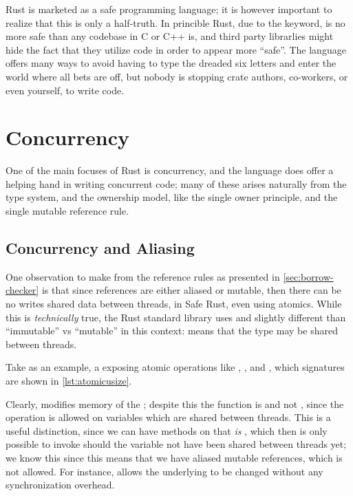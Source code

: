 Rust is marketed as a safe programming language; it is however important to realize that this is
only a half-truth. In princible Rust, due to the  keyword, is no more safe than any
codebase in C or C++ is, and third party librarlies might hide the fact that they utilize
 code in order to appear more ``safe''. The language offers many ways to avoid having
to type the dreaded six letters and enter the world where all bets are off, but nobody is stopping
crate authors, co-workers, or even yourself, to write  code.



\section{Concurrency}

One of the main focuses of Rust is concurrency, and the language does offer a helping hand in
writing concurrent code; many of these arises naturally from the type system, and the ownership
model, like the single owner principle, and the single mutable reference rule.


\subsection{Concurrency and Aliasing\label{sec:concurrency-and-aliasing}}

One observation to make from the reference rules as presented in \cref{sec:borrow-checker} is that
since references are either aliased or mutable, then there can be no writes shared data between
threads, in Safe Rust, even using atomics. While this is \emph{technically} true, the Rust standard
library uses  and  slightly different than ``immutable'' vs ``mutable'' in
this context:  means that the type may be shared between threads.

Take  as an example, a  exposing atomic operations like ,
, and , which signatures are shown in \cref{lst:atomicusize}.

Clearly,  modifies memory of the ; despite this the function
is  and not , since the operation is allowed on variables which are
shared between threads.
This is a useful distinction, since we can have methods on  that \emph{is}
, which then is only possible to invoke should the variable not have been shared
between threads yet; we know this since this means that we have aliased mutable references, which
is not allowed. For instance,  allows the
underlying  to be changed without any synchronization overhead.



